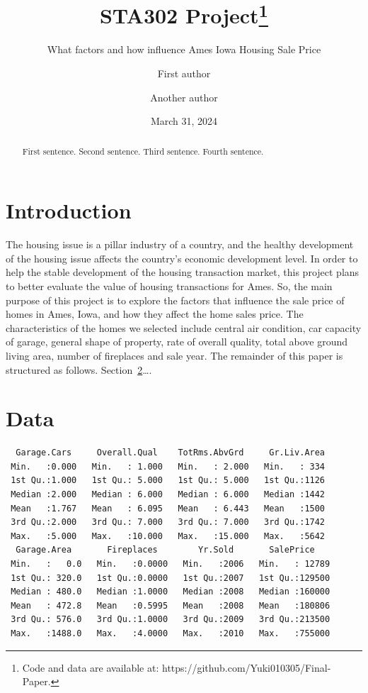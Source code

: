 \documentclass[
  letterpaper,
  DIV=11,
  numbers=noendperiod]{scrartcl}
\title{STA302 Project\thanks{Code and data are available at:
https://github.com/Yuki010305/Final-Paper.}}
\subtitle{What factors and how influence Ames Iowa Housing Sale Price}
\author{First author \and Another author}
\date{March 31, 2024}
\begin{document}
\maketitle
\begin{abstract}
First sentence. Second sentence. Third sentence. Fourth sentence.
\end{abstract}

\section{Introduction}\label{introduction}

The housing issue is a pillar industry of a country, and the healthy
development of the housing issue affects the country's economic
development level. In order to help the stable development of the
housing transaction market, this project plans to better evaluate the
value of housing transactions for Ames. So, the main purpose of this
project is to explore the factors that influence the sale price of homes
in Ames, Iowa, and how they affect the home sales price. The
characteristics of the homes we selected include central air condition,
car capacity of garage, general shape of property, rate of overall
quality, total above ground living area, number of fireplaces and sale
year. The remainder of this paper is structured as follows.
Section~\ref{sec-data}\ldots.

\section{Data}\label{sec-data}

\begin{verbatim}
  Garage.Cars     Overall.Qual    TotRms.AbvGrd     Gr.Liv.Area  
 Min.   :0.000   Min.   : 1.000   Min.   : 2.000   Min.   : 334  
 1st Qu.:1.000   1st Qu.: 5.000   1st Qu.: 5.000   1st Qu.:1126  
 Median :2.000   Median : 6.000   Median : 6.000   Median :1442  
 Mean   :1.767   Mean   : 6.095   Mean   : 6.443   Mean   :1500  
 3rd Qu.:2.000   3rd Qu.: 7.000   3rd Qu.: 7.000   3rd Qu.:1742  
 Max.   :5.000   Max.   :10.000   Max.   :15.000   Max.   :5642  
  Garage.Area       Fireplaces        Yr.Sold       SalePrice     
 Min.   :   0.0   Min.   :0.0000   Min.   :2006   Min.   : 12789  
 1st Qu.: 320.0   1st Qu.:0.0000   1st Qu.:2007   1st Qu.:129500  
 Median : 480.0   Median :1.0000   Median :2008   Median :160000  
 Mean   : 472.8   Mean   :0.5995   Mean   :2008   Mean   :180806  
 3rd Qu.: 576.0   3rd Qu.:1.0000   3rd Qu.:2009   3rd Qu.:213500  
 Max.   :1488.0   Max.   :4.0000   Max.   :2010   Max.   :755000  
\end{verbatim}
\end{document}
